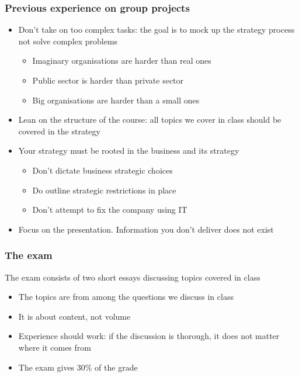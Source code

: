 \begin{frame}[fragile]
  \frametitle{Previous experience on group projects}
  	\begin{itemize}
		\item Don't take on too complex tasks: the goal is to mock up the strategy process not solve complex problems
		\begin{itemize}
			\item Imaginary organisations are harder than real ones
			\item Public sector is harder than private sector
			\item Big organisations are harder than a small ones
		\end{itemize}
		\item Lean on the structure of the course: all topics we cover in class should be covered in the strategy
		\item Your strategy must be rooted in the business and its strategy
		\begin{itemize}
			\item Don't dictate business strategic choices
			\item Do outline strategic restrictions in place
			\item Don't attempt to fix the company using IT
		\end{itemize}
		\item Focus on the presentation. Information you don't deliver does not exist
	\end{itemize}
\end{frame}


\begin{frame}[fragile]
  \frametitle{The exam}
	The exam consists of two short essays discussing topics covered in class
  	\begin{itemize}	
		\item The topics are from among the questions we discuss in class
		\item It is about content, not volume
		\item Experience should work: if the discussion is thorough, it does not matter where it comes from
		\item The exam gives 30\% of the grade
	\end{itemize}
\end{frame}


